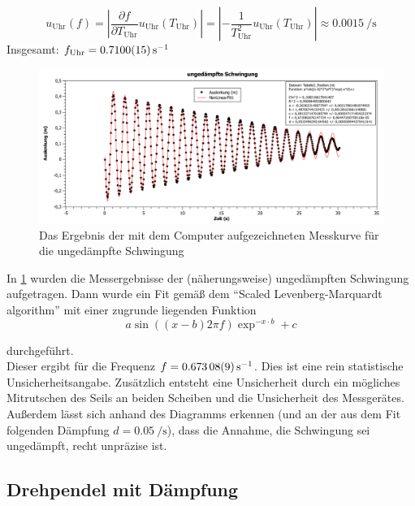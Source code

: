 \documentclass[
	a4paper,
	12pt,
	pagesize,
	ngerman
]{scrartcl}
\begin{document}
	\begin{equation}
		u_\text{Uhr}(f) = \left|  \frac{\partial f}{\partial T_\text{Uhr}} u_\text{Uhr}(T_\text{Uhr}) \right| = \left| - \frac{1}{T_\text{Uhr}^2}u_\text{Uhr}(T_\text{Uhr}) \right| \approx \SI{0,0015}{\per \second} %
	\end{equation}
	Insgesamt: $f_\text{Uhr} = \SI{0,71 \pm 0,0015}{\per \second}  $
	\begin{figure}[htb]
		\includegraphics[width=1\textwidth]{Ungedaempfte_Schwingung_Graph}
		\centering
		\caption{Das Ergebnis der mit dem Computer aufgezeichneten Messkurve für die ungedämpfte Schwingung}
		\label{ungedämpfte_Schwingung}
		\centering
	\end{figure}
	In \cref{ungedämpfte_Schwingung} wurden die Messergebnisse der (näherungsweise) ungedämpften Schwingung aufgetragen. Dann wurde ein Fit gemäß dem \enquote{Scaled Levenberg-Marquardt algorithm} mit einer zugrunde liegenden Funktion
	\begin{equation}
	a \sin ((x-b)2 \pi f) \exp^{-x \cdot b} + c
	\end{equation}
	
	durchgeführt.\\
	Dieser ergibt für die Frequenz $ f = \SI{0,67308 \pm 0,00009}{\per \second} $. Dies ist eine rein statistische Unsicherheitsangabe. Zusätzlich entsteht eine Unsicherheit durch ein mögliches Mitrutschen des Seils an beiden Scheiben und die Unsicherheit des Messgerätes. %
	Außerdem lässt sich anhand des Diagramms erkennen (und an der aus dem Fit folgenden Dämpfung $ d= \SI{0,05}{\per \second} $), dass die Annahme, die Schwingung sei ungedämpft, recht unpräzise ist.
	
	\subsection{Drehpendel mit Dämpfung}
	
\end{document}
